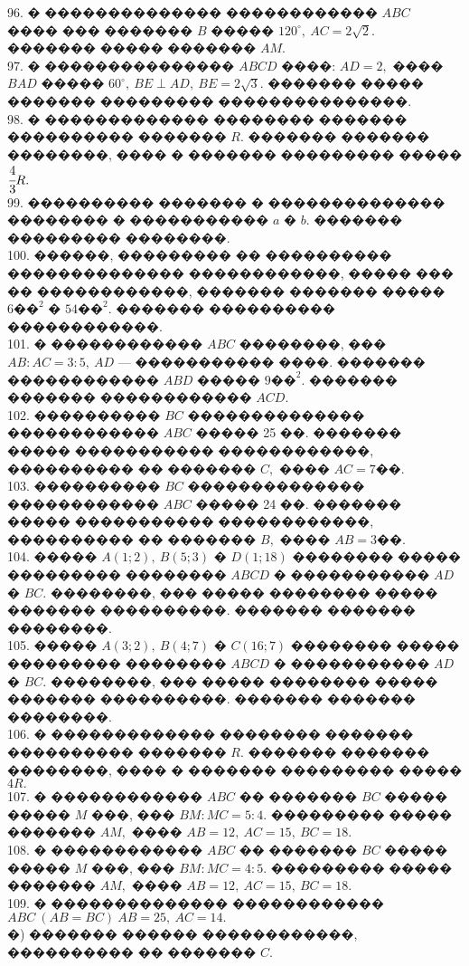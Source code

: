 \documentclass[12pt]{article}
\begin{document}
96. � �������������� ������������ $ABC$ ���� ��� ������� $B$ ����� $120^\circ,\ AC=2\sqrt{2}.$ ������� ����� ������� $AM.$\\
97. � ��������������� $ABCD$ ����: $AD=2,$ ���� $BAD$ ����� $60^\circ,\ BE\perp AD,\ BE=2\sqrt{3}.$ ������� ����� ������� ��������� ���������������.\\
98. � ������������� �������� ������� ���������� ������� $R.$ ������� ������� ��������, ���� � ������� ��������� ����� $\cfrac{4}{3}R.$\\
99. ���������� ������� � �������������� �������� � �����������  $a$ � $b.$ ������� ��������� ��������.\\
100. ������, ��������� �� ���������� �������������� ������������, ����� ��� �� ������������, ������� ������� ����� $6\text{��}^2$ � $54\text{��}^2.$ ������� ���������� ������������.\\
101. � ������������ $ABC$ ��������, ��� $AB:AC=3:5,\ AD$ --- ����������� ����. ������� ������������ $ABD$ ����� $9\text{��}^2.$ ������� ������� ������������ $ACD.$\\
102. ���������� $BC$ �������������� ������������ $ABC$ ����� 25 ��. ������� ����� ����������� ������������, ���������� �� ������� $C,$ ���� $AC=7$��.\\
103. ���������� $BC$ �������������� ������������ $ABC$ ����� 24 ��. ������� ����� ����������� ������������, ���������� �� ������� $B,$ ���� $AB=3$��.\\
104. ����� $A(1;2),\ B(5;3)$ � $D(1;18)$ �������� ����� ��������� ��������
$ABCD$ � ����������� $AD$ � $BC.$ ��������, ��� ����� �������� ����� ������� ����������. ������� ������� ��������.\\
105. ����� $A(3;2),\ B(4;7)$ � $C(16;7)$ �������� ����� ��������� ��������
$ABCD$ � ����������� $AD$ � $BC.$ ��������, ��� ����� �������� ����� ������� ����������. ������� ������� ��������.\\
106. � ������������� �������� ������� ���������� ������� $R.$ ������� ������� ��������, ���� � ������� ��������� ����� $4R.$\\
107. � ������������ $ABC$ �� ������� $BC$ ����� ����� $M$ ���, ��� $BM:MC=5:4.$ ��������� ����� ������� $AM,$ ���� $AB=12,\ AC=15,\ BC=18.$\\
108. � ������������ $ABC$ �� ������� $BC$ ����� ����� $M$ ���, ��� $BM:MC=4:5.$ ��������� ����� ������� $AM,$ ���� $AB=12,\ AC=15,\ BC=18.$\\
109. � �������������� ������������ $ABC\ (AB=BC)\ AB=25,\ AC=14.$\\
�) ������� ������ ������������, ���������� �� ������� $C.$\\
\end{document}
